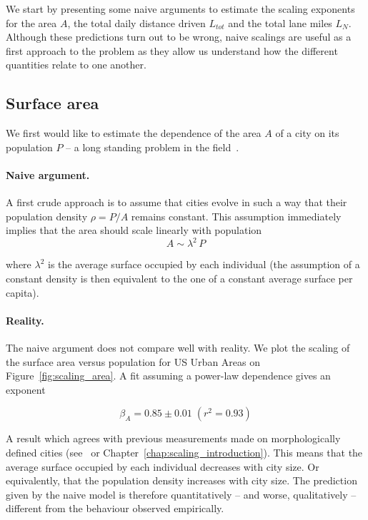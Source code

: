 We start by presenting some naive arguments to estimate the scaling exponents
for the area $A$, the total daily distance driven $L_{tot}$ and the total lane
miles $L_N$. Although these predictions turn out to be wrong, naive scalings are
useful as a first approach to the problem as they allow us understand how the
different quantities relate to one another.

\subsection{Surface area}

We first would like to estimate the dependence of the area
$A$ of a city on its population $P$ -- a long standing problem in the
field~\cite{Stewart:1947, Batty:2011}.

\paragraph{Naive argument.}  A first crude approach is to assume
that cities evolve in such a way that their population density $\rho = P/A$
remains constant. This assumption immediately implies that the area should
scale linearly with population
%
\begin{equation} 
    A \sim \lambda^2\, P 
    \label{eq:area_naive} 
\end{equation}

where $\lambda^2$ is the average surface occupied by each individual (the
assumption of a constant density is then equivalent to the one of a constant
average surface per capita).

\paragraph{Reality.} The naive argument does not compare well with reality. We
plot the scaling of the surface area versus population for US Urban Areas on
Figure~\ref{fig:scaling_area}. A fit assuming a power-law dependence gives an exponent

\begin{equation}
    \boxed{\beta_A = 0.85 \pm 0.01\;(r^2 = 0.93)}
\end{equation}

A result which agrees with previous measurements made on morphologically defined
cities (see~\cite{Batty:2011} or Chapter~\ref{chap:scaling_introduction}). This means that the average surface occupied by each individual decreases with
city size. Or equivalently, that the population density increases with city size.
The prediction given by the naive model is therefore quantitatively -- and
worse, qualitatively -- different from the behaviour observed empirically.

